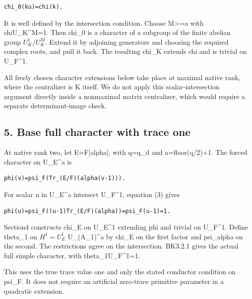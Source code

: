 \begin{Verbatim}[fontsize=\small,breaklines=true,breakanywhere=true]
chi_0(ku)=chi(k).
\end{Verbatim}

It is well defined by the intersection condition. Choose M\textgreater=a
with chi\textbar U\_K\^{}M=1. Then chi\_0 is a character of a subgroup
of the finite abelian group \(U_K^1/U_K^M\). Extend it by
adjoining generators and choosing the required complex roots, and pull
it back. The resulting chi\_K extends chi and is trivial on U\_F\^{}1.

All freely chosen character extensions below take place at maximal
native rank, where the centralizer is K itself. We do not apply this
scalar-intersection argument directly inside a nonmaximal matrix
centralizer, which would require a separate determinant-image check.

\hypertarget{dyadic_character-base-full-character-with-trace-one}{%
\subsection{5. Base full character with trace
one}\label{dyadic_character-base-full-character-with-trace-one}}

At native rank two, let E=F{[}alpha{]}, with q=q\_d and a=floor(q/2)+1.
The forced character on U\_E\^{}a is

\begin{Verbatim}[fontsize=\small,breaklines=true,breakanywhere=true]
phi(v)=psi_F(Tr_(E/F)(alpha(v-1))).
\end{Verbatim}

For scalar u in U\_E\^{}a intersect U\_F\^{}1, equation (3) gives

\begin{Verbatim}[fontsize=\small,breaklines=true,breakanywhere=true]
phi(u)=psi_F((u-1)Tr_(E/F)(alpha))=psi_F(u-1)=1.
\end{Verbatim}

Section4 constructs chi\_E on U\_E\^{}1 extending phi and trivial on
U\_F\^{}1. Define theta\_1 on \(H^1=U_E^1\) U\_(A\_1)\^{}a
by chi\_E on the first factor and psi\_alpha on the second. The
restrictions agree on the intersection. BK3.2.1 gives the actual full
simple character, with theta\_1\textbar U\_F\^{}1=1.

This uses the true trace value one and only the stated conductor
condition on psi\_F. It does not require an artificial zero-trace
primitive parameter in a quadratic extension.

